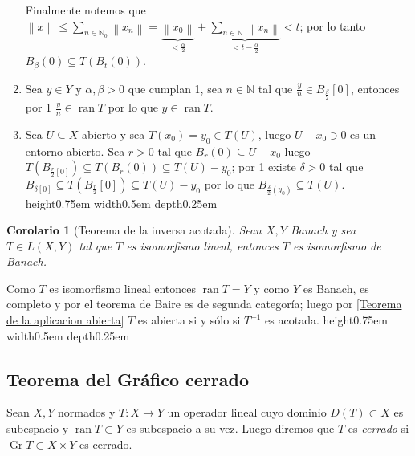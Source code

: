 \documentclass[11pt]{article}
\newcommand{\N}{{\mathbb{N}}}
\newcommand{\norm}[1]{\left\lVert#1\right\rVert}
\newcommand{\Bigsum}[2]{\sum\limits_{#1}{#2}}
\DeclareMathOperator{\rank}{ran}
\DeclareMathOperator{\graf}{Gr}
\numberwithin{theorem}{subsection}
\newtheorem{corollary}[theorem]{Corolario}
\newenvironment{proof}[1][Demostraci\'on]{\begin{trivlist}
		\item[\hskip \labelsep {\bfseries #1}]}{\end{trivlist}}
\newenvironment{definition}[1][Definici\'on]{\begin{trivlist}
		\item[\hskip \labelsep {\bfseries #1}]}{\end{trivlist}}
\newcommand{\qed}{\nobreak \ifvmode \relax \else
	\ifdim\lastskip<1.5em \hskip-\lastskip
	\hskip1.5em plus0em minus0.5em \fi \nobreak
	\vrule height0.75em width0.5em depth0.25em\fi}
\begin{document}
\begin{proof}
\begin{enumerate}
		Finalmente notemos que $\norm{x} \leq \Bigsum{n \in \N_0}{\norm{x_n}} = \underbrace{\norm{x_0}}_{< \frac{\alpha}{2}} + \underbrace{\Bigsum{n \in \N}{\norm{x_n}}}_{< t - \frac{\alpha}{2}} < t$; por lo tanto $B_{\beta}(0) \subseteq T \left(B_t(0) \right)$.
		
		\item Sea $y \in Y$ y $\alpha,\beta > 0$ que cumplan 1, sea $n \in \N$ tal que $\frac{y}{n} \in B_{\frac{\beta}{2}}[0]$, entonces por 1 $\frac{y}{n} \in \rank T$ por lo que $y \in \rank T$.
		
		\item Sea $U \subseteq X$ abierto y sea $T(x_0) = y_0 \in T(U)$, luego $U - x_0 \ni 0$ es un entorno abierto. Sea $r > 0$ tal que $B_r(0) \subseteq U-x_0$ luego $T(B_{\frac{r}{2}[0]}) \subseteq T \left(B_r(0)\right) \subseteq T \left(U\right) - y_0$; por 1 existe $\delta > 0$ tal que $B_{\delta[0]} \subseteq T \left(B_{\frac{r}{2}}[0]\right) \subseteq T(U) - y_0$ por lo que $B_{\frac{\delta}{2}(y_0)} \subseteq T(U)$. \qed
		
		
				
	\end{enumerate}
	
\end{proof}

\begin{corollary}[Teorema de la inversa acotada]
	\label{Teorema de la inversa acotada}
	Sean $X,Y$ Banach y sea $T \in L(X,Y)$ tal que $T$ es isomorfismo lineal, entonces $T$ es isomorfismo de Banach.	
\end{corollary}

\begin{proof}
	Como $T$ es isomorfismo lineal entonces $\rank T = Y$ y como $Y$ es Banach, es completo y por el teorema de Baire es de segunda categor\'ia; luego por \ref{Teorema de la aplicacion abierta} $T$ es abierta si y s\'olo si $T^{-1}$ es acotada. \qed
\end{proof}

\subsection{Teorema del Gr\'afico cerrado}

\begin{definition}
	Sean $X,Y$ normados y $T:X \rightarrow Y$ un operador lineal cuyo dominio $D(T) \subset X$ es subespacio y $\rank T \subset Y$ es subespacio a su vez. Luego diremos que $T$ es \textit{cerrado} si $\graf T \subset X \times Y$ es cerrado.
\end{definition}
\end{document}
